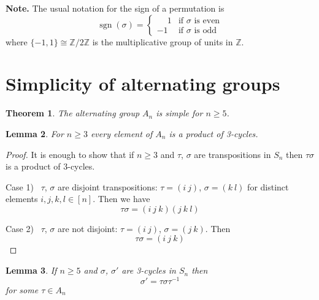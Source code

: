 \documentclass[12pt, letterpaper, oneside]{article}
\theoremstyle{plain}
\newtheorem{theorem}{Theorem}[section]
\newtheorem{lemma}[theorem]{Lemma}
\theoremstyle{definition}
\newcommand{\Z}{{\mathbb Z}}
\newcommand{\sgn}{\operatorname{sgn}}
\newcommand{\vs}{\vskip 5mm}
\begin{document}
\vs

\textbf{Note.} The usual notation for the sign of a permutation is
$$
\sgn(\sigma) = 
\begin{cases}
\phantom{-}1 & \text{if $\sigma$ is even} \\
 -1 & \text{if $\sigma$ is odd}
\end{cases}
$$
where $\{-1, 1\} \cong \Z/2\Z$ is the multiplicative group of units in $\Z$.





\newpage
\section{Simplicity of  alternating groups}
\label{SEC_SIMPALTGPS}


\begin{theorem}
\label{THM_ALTSIMP}
The alternating group $A_{n}$ is simple for  $n \geq 5$.
\end{theorem}

\vs\vs

\begin{lemma}
\label{LEMMA_ANSIMPL1}
For $n\geq 3$   every element of $A_{n}$ is a product of 3-cycles. 
\end{lemma}

\vs

\begin{proof}
It is enough to show that if $n\geq 3$ and  $\tau$, $\sigma$ are transpositions in $S_{n}$
then $\tau\sigma$ is a product of 3-cycles. 

Case 1) \ $\tau$, $\sigma$ are disjoint transpositions: $\tau = (i \ j)$, $\sigma = (k \ l)$ for 
distinct elements $i, j, k, l \in [n]$. Then we have
$$\tau\sigma = (i \ j \ k)(j \ k \ l)$$


Case 2) \ $\tau$, $\sigma$ are not disjoint: $\tau = (i \ j)$, $\sigma = (j \ k)$. Then 
$$\tau\sigma = (i\ j \ k)$$

\end{proof}

\vs\vs

\begin{lemma}
\label{LEMMA_ANSIMPL2}
If $n\geq 5$ and $\sigma$, $\sigma'$ are 3-cycles  in $S_{n}$ then 
$$\sigma' = \tau\sigma\tau^{-1}$$
for some $\tau\in A_{n}$
\end{lemma}
\end{document}
